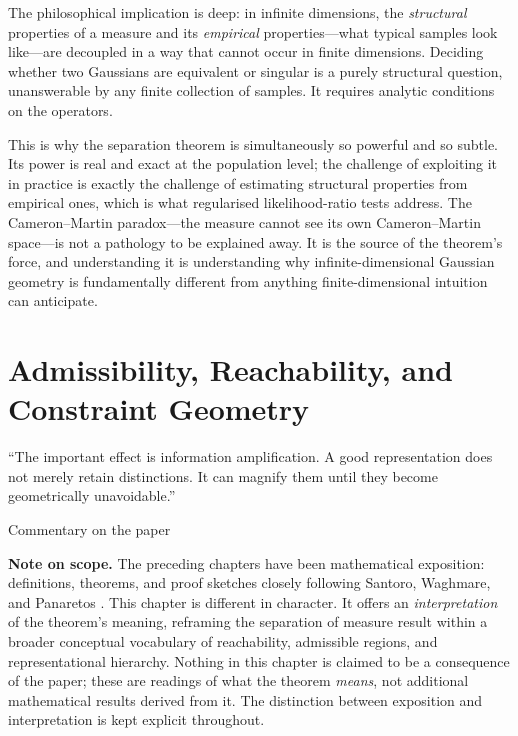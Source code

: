 \documentclass[12pt, oneside]{book}
\theoremstyle{plain}
\theoremstyle{definition}
\begin{document}
The philosophical implication is deep: in infinite dimensions, the \emph{structural} properties of a measure and its \emph{empirical} properties---what typical samples look like---are decoupled in a way that cannot occur in finite dimensions. Deciding whether two Gaussians are equivalent or singular is a purely structural question, unanswerable by any finite collection of samples. It requires analytic conditions on the operators.

This is why the separation theorem is simultaneously so powerful and so subtle. Its power is real and exact at the population level; the challenge of exploiting it in practice is exactly the challenge of estimating structural properties from empirical ones, which is what regularised likelihood-ratio tests address. The Cameron--Martin paradox---the measure cannot see its own Cameron--Martin space---is not a pathology to be explained away. It is the source of the theorem's force, and understanding it is understanding why infinite-dimensional Gaussian geometry is fundamentally different from anything finite-dimensional intuition can anticipate.

\chapter{Admissibility, Reachability, and Constraint Geometry}
\label{chap:admissibility}

\epigraph{``The important effect is information amplification. A good representation does not
merely retain distinctions. It can magnify them until they become geometrically
unavoidable.''}{Commentary on the paper}

\begin{highlightbox}
\textbf{Note on scope.} The preceding chapters have been mathematical exposition: definitions, theorems, and proof sketches closely following Santoro, Waghmare, and Panaretos \cite{SantoroPNAS2026}. This chapter is different in character. It offers an \emph{interpretation} of the theorem's meaning, reframing the separation of measure result within a broader conceptual vocabulary of reachability, admissible regions, and representational hierarchy. Nothing in this chapter is claimed to be a consequence of the paper; these are readings of what the theorem \emph{means}, not additional mathematical results derived from it. The distinction between exposition and interpretation is kept explicit throughout.
\end{highlightbox}
\end{document}
